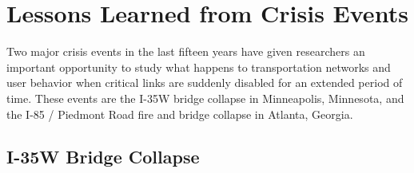 \begin{table}

\caption{AEM Criticality Score}
\label{tab:aemscore}
\end{table}

\section{Lessons Learned from Crisis Events}

Two major crisis events in the last fifteen years have given researchers
an important opportunity
to study what happens to transportation networks and user behavior when critical links are
suddenly disabled for an
extended period of time. These events are the I-35W bridge
collapse in
Minneapolis, Minnesota, and the I-85 / Piedmont Road fire and bridge
collapse in Atlanta, Georgia.

\subsection{I-35W Bridge Collapse}

